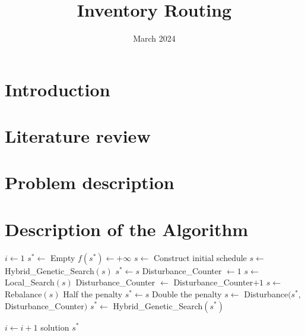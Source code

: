 \documentclass{article}
\title{Inventory Routing}
\date{March 2024}
\begin{document}
\maketitle

\section{Introduction}


\section{Literature review}


\section{Problem description}


\section{Description of the Algorithm}


\begin{algorithm}[H]
\caption{\textbf{Main algorithm}}
\begin{algorithmic}[1]
\STATE $i\gets 1$
\STATE $s^* \gets$ Empty \AND  $f(s^*) \gets +\infty$ 
\STATE $s\gets$ Construct initial schedule 
\STATE $s\gets$ Hybrid\_Genetic\_Search$(s)$  
    \STATE $s^*\gets s$
\ENDIF
\STATE Disturbance\_Counter $\gets 1$
    \STATE $s\gets$ Local\_Search$(s)$
    \STATE Disturbance\_Counter $\gets$ Disturbance\_Counter$+1$
        \STATE $s\gets$ Rebalance$(s)$
            \STATE Half the penalty
        \ENDIF
            \STATE $s^*\gets s$
        \ENDIF
        \STATE Double the penalty
    \ENDIF
    \STATE $s \gets$ Disturbance$(s^*,$ Disturbance\_Counter$)$  
\ENDWHILE
\STATE $s^*\gets$ Hybrid\_Genetic\_Search$(s^*)$ %

%
\STATE $i\gets i+1$
\ENDWHILE
\RETURN solution $s^*$
\end{algorithmic}
\end{algorithm}
\end{document}
